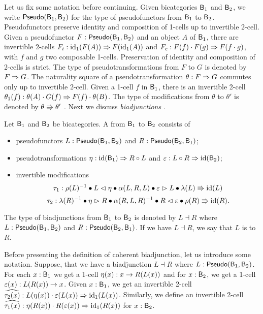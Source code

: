 Let us fix some notation before continuing.  Given bicategories $\mathsf{B}_1$
and $\mathsf{B}_2$, we write $\mathsf{Pseudo}(\mathsf{B}_1, \mathsf{B}_2)$ for the type of
pseudofunctors from $\mathsf{B}_1$ to $\mathsf{B}_2$. Pseudofunctors preserve identity
and composition of 1-cells up to invertible 2-cell. Given a
pseudofunctor $F : \mathsf{Pseudo}(\mathsf{B}_1, \mathsf{B}_2)$ and an object $A$ of $\mathsf{B}_1$,
there are invertible 2-cells ${F}_i :\operatorname{id}_1(F(A)) \Rightarrow
F(\operatorname{id}_1(A))$ and ${F}_c : F(f) \cdot F(g) \Rightarrow F(f \cdot
g)$, with $f$ and $g$ two composable 1-cells. Preservation of identity
and composition of 2-cells is strict.
The type of pseudotransformations from $F$ to $G$ is denoted by
$F \Rightarrow G$.
The naturality square of a pseudotransformation $\theta : F \Rightarrow G$ commutes only up to invertible 2-cell. Given a 1-cell $f$ in $\mathsf{B}_1$, there is an invertible 2-cell $\theta_1(f) : \theta(A) \cdot G(f) \Rightarrow F(f) \cdot \theta(B)$.
The type of modifications from $\theta$ to
$\theta'$ is denoted by $\theta \Rrightarrow \theta'$
\cite{leinster:basic-bicats}.  Next we discuss \emph {biadjunctions}
\cite{gurski2012biequivalences,LACK2000179}.

\begin{definition}
Let $\mathsf{B}_1$ and $\mathsf{B}_2$ be bicategories.
A  from $\mathsf{B}_1$ to $\mathsf{B}_2$ consists of
\begin{itemize}
	\item pseudofunctors $L : \mathsf{Pseudo}(\mathsf{B}_1, \mathsf{B}_2)$ and $R : \mathsf{Pseudo}(\mathsf{B}_2, \mathsf{B}_1)$;
	\item pseudotransformations $\eta : \operatorname{id}(\mathsf{B}_1) \Rightarrow R \circ L$ and $\varepsilon : L \circ R \Rightarrow \operatorname{id}(\mathsf{B}_2)$;
	\item invertible modifications
	\[
	\tau_1 : \rho(L)^{-1} \bullet L \vartriangleleft \eta \bullet \alpha(L, R, L) \bullet \varepsilon \vartriangleright L \bullet \lambda(L) \Rrightarrow \operatorname{id}(L)
	\]
	\[
	\tau_2 : \lambda(R)^{-1} \bullet \eta \vartriangleright R \bullet \alpha(R, L, R)^{-1} \bullet R \vartriangleleft \varepsilon \bullet \rho(R) \Rrightarrow \operatorname{id}(R).
	\]
\end{itemize}
The type of biadjunctions from $\mathsf{B}_1$ to $\mathsf{B}_2$ is denoted by $L \dashv R$
where $L : \mathsf{Pseudo}(\mathsf{B}_1, \mathsf{B}_2)$ and $R : \mathsf{Pseudo}(\mathsf{B}_2, \mathsf{B}_1)$.
If we have $L \dashv R$, we say that $L$ is  to $R$.
\end{definition}

Before presenting the definition of coherent biadjunction, let us introduce some notation.
Suppose, that we have a biadjunction $L \dashv R$ where $L : \mathsf{Pseudo}(\mathsf{B}_1, \mathsf{B}_2)$.
For each $x : \mathsf{B}_1$ we get a 1-cell $\eta(x) : x \rightarrow R(L(x))$ and for $x : \mathsf{B}_2$, we get a 1-cell $\varepsilon(x) : L(R(x)) \rightarrow x$.
Given $x : \mathsf{B}_1$, we get an invertible 2-cell $\widehat{\tau_2(x)} : L(\eta(x)) \cdot \varepsilon(L(x)) \Rightarrow \operatorname{id}_1(L(x))$.
Similarly, we define an invertible 2-cell $\widehat{\tau_1(x)} : \eta(R(x)) \cdot R(\varepsilon(x)) \Rightarrow \operatorname{id}_1(R(x))$ for $x : \mathsf{B}_2$.

